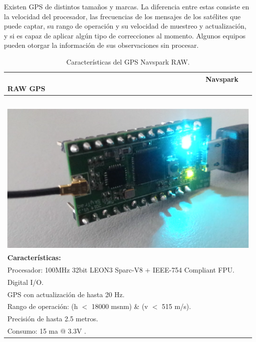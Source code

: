 Existen GPS de distintos tamaños y marcas. La diferencia entre estas consiste en la velocidad del procesador, las frecuencias de los mensajes de los satélites que puede captar, su rango de operación y su velocidad de muestreo y actualización, y si es capaz de aplicar algún tipo de correcciones al momento. Algunos equipos pueden otorgar la información de sus observaciones sin procesar.

\begin{table}[H]
\begin{center}
\caption{Características del GPS Navspark RAW.}
\begin{tabular}{|l|}
	\hline
	        \ \ \ \ \ \ \ \ \ \ \ \ \ \ \ \ \ \ \ \ \ \ \ \ \ \ \ \ \ \ \ \ \ \ \ \ \ \ \ \ \ \ \ \ \ \ \ \ \ \ \textbf{Navspark RAW GPS} \\
	\hline
		\\  \ \ \ \ \ \ \ \ \ \ \ \ \ \ \ \ \ \ \ \ \ \ \ \ \ \ \ \ \ \ \ \ \ \ \ \ \ \ \ \ \includegraphics[width=0.37\linewidth]{Figures/NavGPS}
		\label{fig:nsraw}\\
	
	\textbf{Características:}\\
		\tabitem Procesador: 100MHz 32bit LEON3 Sparc-V8 + IEEE-754 Compliant FPU.\\
		\tabitem 17 Digital I/O.\\
		\tabitem GPS con actualización de hasta 20 Hz.\\
		\tabitem Rango de operación: (h $<$ 18000 msnm) \& (v $<$ 515 m/s).\\
		\tabitem Precisión de hasta 2.5 metros.\\
		\tabitem Consumo: 15 ma @ 3.3V \citep{nsraw}.\\
	\hline
\end{tabular}
\end{center}
\end{table}

